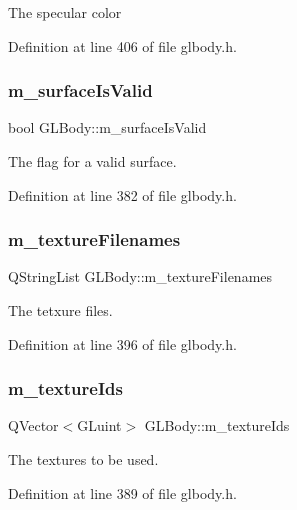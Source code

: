 The specular color 

Definition at line 406 of file glbody.\+h.

\mbox{\label{class_g_l_body_a518355cd5063cb8f7354065f2c521cbc}} 
\subsubsection{\texorpdfstring{m\_surfaceIsValid}{m\_surfaceIsValid}}
{\footnotesize\ttfamily bool G\+L\+Body\+::m\+\_\+surface\+Is\+Valid\hspace{0.3cm}{\ttfamily [protected]}}

The flag for a valid surface. 

Definition at line 382 of file glbody.\+h.

\mbox{\label{class_g_l_body_a51eed96c1bc0d06742d7a9ab455d527d}} 
\subsubsection{\texorpdfstring{m\_textureFilenames}{m\_textureFilenames}}
{\footnotesize\ttfamily Q\+String\+List G\+L\+Body\+::m\+\_\+texture\+Filenames\hspace{0.3cm}{\ttfamily [protected]}}

The tetxure files. 

Definition at line 396 of file glbody.\+h.

\mbox{\label{class_g_l_body_a29c73dfe014e2452dd3a2011929aada3}} 
\subsubsection{\texorpdfstring{m\_textureIds}{m\_textureIds}}
{\footnotesize\ttfamily Q\+Vector$<$G\+Luint$>$ G\+L\+Body\+::m\+\_\+texture\+Ids\hspace{0.3cm}{\ttfamily [protected]}}

The textures to be used. 

Definition at line 389 of file glbody.\+h.

